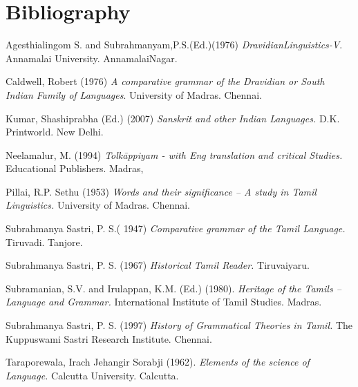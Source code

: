 \section*{Bibliography}

\begin{thebibliography}{99}
 Agesthialingom S. and Subrahmanyam,P.S.(Ed.)(1976) \textit{DravidianLinguistics-V}. Annamalai University. AnnamalaiNagar.

  Caldwell, Robert (1976) \textit{A comparative grammar of the Dravidian or South Indian Family of Languages}. University of Madras. Chennai.

  Kumar, Shashiprabha (Ed.) (2007) \textit{Sanskrit and other Indian Languages.} D.K. Printworld. New Delhi.

  Neelamalur, M. (1994) \textit{Tolkāppiyam - with Eng translation and critical Studies.} Educational Publishers. Madras, 

  Pillai, R.P. Sethu (1953) \textit{Words and their significance – A study in Tamil Linguistics.} University of Madras. Chennai.

  Subrahmanya Sastri, P. S.( 1947) \textit{Comparative grammar of the Tamil Language.} Tiruvadi. Tanjore.

  Subrahmanya Sastri, P. S. (1967) \textit{Historical Tamil Reader.} Tiruvaiyaru.

  Subramanian, S.V. and Irulappan, K.M. (Ed.) (1980). \textit{Heritage of the Tamils – Language and Grammar.} International Institute of Tamil Studies. Madras.

  Subrahmanya Sastri, P. S. (1997) \textit{History of Grammatical Theories in Tamil.} The Kuppuswami Sastri Research Institute. Chennai.

  Taraporewala, Irach Jehangir Sorabji (1962). \textit{Elements of the science of Language.} Calcutta University. Calcutta.

 \end{thebibliography}

\theendnotes

